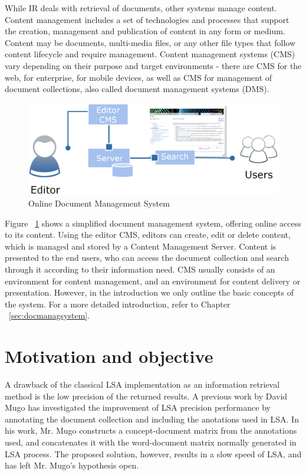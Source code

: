 While IR deals with retrieval of documents, other systems manage content. Content management includes a set of technologies and processes that support the creation, management and publication of content in any form or medium. Content may be documents, multi-media files, or any other file types that follow content lifecycle and require management. Content management systems (CMS) vary depending on their purpose and target environments - there are CMS for the web, for enterprise, for mobile devices, as well as CMS for management of document collections, also called document management systems (DMS). \\

%
%
\begin{figure}[htbp]
	\centering
	\includegraphics[width=\ScaleIfNeeded]{img/cms-simplified} 
	\caption{ Online Document Management System }
	\label{fig:docmachine}
\end{figure}

Figure ~\ref{fig:docmachine} shows a simplified document management system, offering online access to its content. Using the editor CMS, editors can create, edit or delete content, which is managed and stored by a Content Management Server. Content is presented to the end users, who can access the document collection and search through it according to their information need. CMS usually consists of an environment for content management, and an environment for content delivery or presentation. However, in the introduction we only outline the basic concepts of the system. For a more detailed introduction, refer to Chapter ~\ref{sec:docmanagsystem}. \\


\section{Motivation and objective}
\label{sec:introduction:motandobj}  
A drawback of the classical LSA implementation as an information retrieval method is the low precision of the returned results. A previous work by David Mugo \cite{mugo10} has investigated the improvement of LSA precision performance by annotating the document collection and including the anotations used in LSA. In his work, Mr. Mugo constructs a concept-document matrix from the annotations used, and concatenates it with the word-document matrix normally generated in LSA process. The proposed solution, however, results in a slow speed of LSA, and has left Mr. Mugo's hypothesis open. \\


